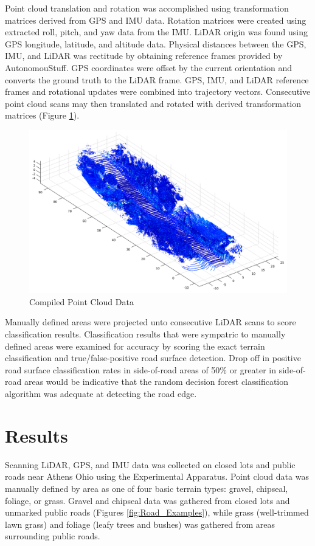 \documentclass[journal,onecolumn]{IEEEtran}
\begin{document}
{	Point cloud translation and rotation was accomplished using transformation matrices derived from GPS and IMU data. Rotation matrices were created using extracted roll, pitch, and yaw data from the IMU. LiDAR origin was found using GPS longitude, latitude, and altitude data. Physical distances between the GPS, IMU, and LiDAR was rectitude by obtaining reference frames provided by AutonomouStuff. GPS coordinates were offset by the current orientation and converts the ground truth to the LiDAR frame. GPS, IMU, and LiDAR reference frames and rotational updates were combined into trajectory vectors. Consecutive point cloud scans may then translated and rotated with derived transformation matrices (Figure \ref{fig:Compiled_PCD}).
	
	\begin{figure}
		\centering
		\includegraphics[width=0.7\linewidth]{figures/Compiled_PCD}
		\caption[Compiled Point Cloud Data]{Compiled Point Cloud Data}
		\label{fig:Compiled_PCD}
	\end{figure}
	
	Manually defined areas were projected unto consecutive LiDAR scans to score classification results. Classification results that were sympatric to manually defined areas were examined for accuracy by scoring the exact terrain classification and true/false-positive road surface detection. Drop off in positive road surface classification rates in side-of-road areas of 50\% or greater in side-of-road areas would be indicative that the random decision forest classification algorithm was adequate at detecting the road edge.
	
\section{Results}
	
	Scanning LiDAR, GPS, and IMU data was collected on closed lots and public roads near Athens Ohio using the Experimental Apparatus. Point cloud data was manually defined by area as one of four basic terrain types: gravel, chipseal, foliage, or grass. Gravel and chipseal data was gathered from closed lots and unmarked public roads (Figures \ref{fig:Road_Examples}), while grass (well-trimmed lawn grass) and foliage (leafy trees and bushes) was gathered from areas surrounding public roads.

}
\end{document}

